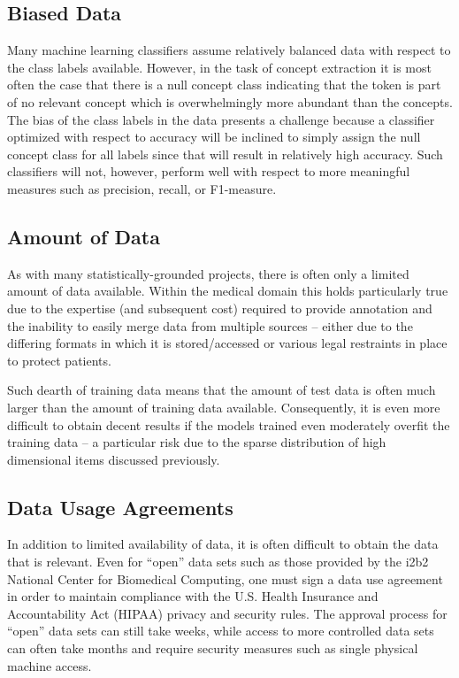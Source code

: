 \documentclass[preprint]{style}
\begin{document}
\subsection{Biased Data}
Many machine learning classifiers assume relatively balanced data with respect to the class labels available. However, in the task of concept extraction it is most often the case that there is a null concept class indicating that the token is part of no relevant concept which is overwhelmingly more abundant than the concepts. The bias of the class labels in the data presents a challenge because a classifier optimized with respect to accuracy will be inclined to simply assign the null concept class for all labels since that will result in relatively high accuracy. Such classifiers will not, however, perform well with respect to more meaningful measures such as precision, recall, or F1-measure.


\subsection{Amount of Data}
As with many statistically-grounded projects, there is often only a limited amount of data available. Within the medical domain this holds particularly true due to the expertise (and subsequent cost) required to provide annotation and the inability to easily merge data from multiple sources -- either due to the differing formats in which it is stored/accessed or various legal restraints in place to protect patients.

Such dearth of training data means that the amount of test data is often much larger than the amount of training data available. Consequently, it is even more difficult to obtain decent results if the models trained even moderately overfit the training data -- a particular risk due to the sparse distribution of high dimensional items discussed previously.

\subsection{Data Usage Agreements}
In addition to limited availability of data, it is often difficult to obtain the data that is relevant. Even for ``open'' data sets such as those provided by the i2b2 National Center for Biomedical Computing, one must sign a data use agreement in order to maintain compliance with the U.S. Health Insurance and Accountability Act (HIPAA) privacy and security rules. The approval process for ``open'' data sets can still take weeks, while access to more controlled data sets can often take months and require security measures such as single physical machine access.
\end{document}
